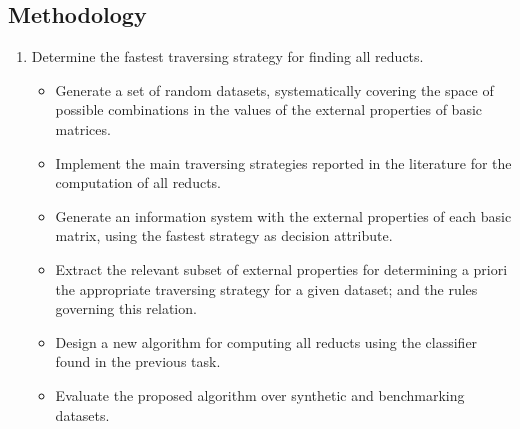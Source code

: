 \documentclass[authoryear,11pt]{elsarticle}
\begin{document}
\subsection{Methodology}\label{Methodology} 
\begin{enumerate}
	\item Determine the fastest traversing strategy for finding all reducts.
	\begin{itemize}
  		\item Generate a set of random datasets, systematically covering the space of possible combinations in 
  			  the values of the external properties of basic matrices.
  		\item Implement the main traversing strategies reported in the literature for the computation of all
  			  reducts.
  		\item Generate an information system with the external properties of each basic matrix, using 
  			  the fastest strategy as decision attribute.
  		\item Extract the relevant subset of external properties for determining a priori the appropriate 
  			  traversing strategy for a given dataset; and the rules governing this relation.
  		\item Design a new algorithm for computing all reducts using the classifier found in
  			  the previous task.
  		\item Evaluate the proposed algorithm over synthetic and benchmarking datasets.
  	\end{itemize}

\end{enumerate}
\end{document}
